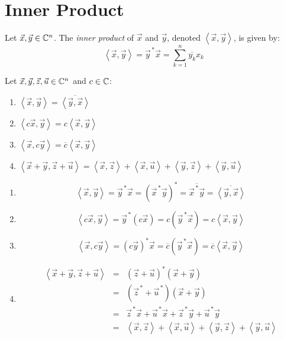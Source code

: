 \documentclass[letterpaper,12pt,fleqn]{article}
\newcommand{\inner}[2]{\left<#1,#2\right>}
\newcommand{\conj}[1]{\overline{#1}}
\newcommand{\vx}{\vec{x}}
\newcommand{\vy}{\vec{y}}
\newcommand{\vz}{\vec{z}}
\newcommand{\vu}{\vec{u}}
\begin{document}
\section*{Inner Product}

\begin{definition}
  Let $\vx,\vy\in\C^n$. The \emph{inner product} of $\vx$ and $\vy$,
  denoted $\inner{\vx}{\vy}$, is given by:
  \[\inner{\vx}{\vy}=\vy^{\,*}\vx=\sum_{k=1}^n\conj{y_k}x_k\]
\end{definition}

\begin{theorem}
  Let $\vx,\vy,\vz,\vu\in\C^n$ and $c\in\mathbb{C}$:
  \begin{enumerate}
  \item $\inner{\vx}{\vy}=\conj{\inner{\vy}{\vx}}$
  \item $\inner{c\vx}{\vy}=c\inner{\vx}{\vy}$
  \item $\inner{\vx}{c\vy}=\conj{c}\inner{\vx}{\vy}$
  \item $\inner{\vx+\vy}{\vz+\vu}=\inner{\vx}{\vz}+\inner{\vx}{\vu}+
    \inner{\vy}{\vz}+\inner{\vy}{\vu}$
  \end{enumerate}
\end{theorem}

\begin{theproof}
  \listbreak
  \begin{enumerate}
  \item
    \[\inner{\vx}{\vy}=\vy^{\,*}\vx=\left(\vx^{\,*}\vy\right)^*=
    \conj{\vx^{\,*}\vy}=\conj{\inner{\vy}{\vx}}\]

  \item
    \[\inner{c\vx}{\vy}=\vy^{\,*}(c\vx)=c(\vy^{\,*}\vx)=c\inner{\vx}{\vy}\]

  \item
    \[\inner{\vx}{c\vy}=(c\vy)^*\vx=\conj{c}(\vy^{\,*}\vx)=
    \conj{c}\inner{\vx}{\vy}\]

  \item
    \begin{eqnarray*}
      \inner{\vx+\vy}{\vz+\vu} &=& (\vz+\vu)^*(\vx+\vy) \\
      &=& (\vz^{\,*}+\vu^{\,*})(\vx+\vy) \\
      &=& \vz^{\,*}\vx+\vu^{\,*}\vx+\vz^{\,*}\vy+\vu^{\,*}\vy \\
      &=& \inner{\vx}{\vz}+\inner{\vx}{\vu}+\inner{\vy}{\vz}+\inner{\vy}{\vu}
    \end{eqnarray*}
  \end{enumerate}
\end{theproof}
\end{document}
